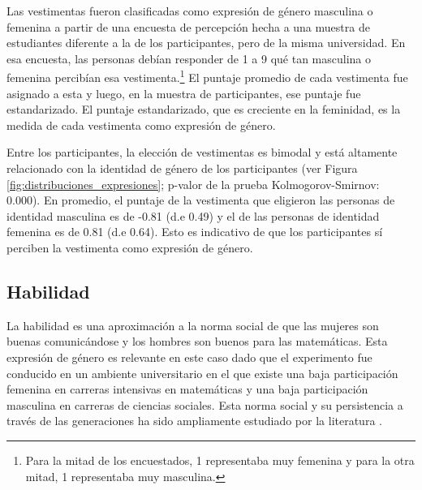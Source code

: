Las vestimentas fueron clasificadas como expresión de género masculina o femenina a partir de una encuesta de percepción hecha a una muestra de estudiantes diferente a la de los participantes, pero de la misma universidad. En esa encuesta, las personas debían responder de 1 a 9 qué tan masculina o femenina percibían esa vestimenta.\footnote{Para la mitad de los encuestados, 1 representaba muy femenina y para la otra mitad, 1 representaba muy masculina.} El puntaje promedio de cada vestimenta fue asignado a esta y luego, en la muestra de participantes, ese puntaje fue estandarizado. El puntaje estandarizado, que es creciente en la feminidad, es la medida de cada vestimenta como expresión de género. 

Entre los participantes, la elección de vestimentas es bimodal y está altamente relacionado con la identidad de género de los participantes (ver Figura \ref{fig:distribuciones_expresiones}; p-valor de la prueba Kolmogorov-Smirnov: 0.000). En promedio, el puntaje de la vestimenta que eligieron las personas de identidad masculina es de -0.81 (d.e 0.49) y el de las personas de identidad femenina es de 0.81 (d.e 0.64). Esto es indicativo de que los participantes sí perciben la vestimenta como expresión de género. 

\subsection{Habilidad} 
La habilidad es una aproximación a la norma social de que las mujeres son buenas comunicándose y los hombres son buenos para las matemáticas. Esta expresión de género es relevante en este caso dado que el experimento fue conducido en un ambiente universitario en el que existe una baja participación femenina en carreras intensivas en matemáticas y una baja participación masculina en carreras de ciencias sociales. Esta norma social y su persistencia a través de las generaciones ha sido ampliamente estudiado por la literatura \citep{nollenberger2016mathgap, giuliano2017gender, saltiel2019gendergapinSTEM, spencer1999mathgenderstereotype, cvencek2011mathgenderstereotype}.


